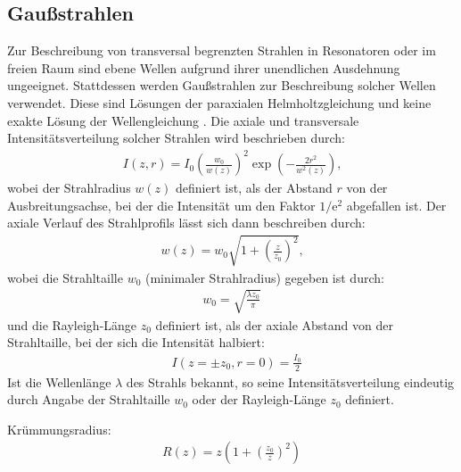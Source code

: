 \documentclass[11pt, a4paper]{article}
\numberwithin{equation}{section}
\begin{document}
\subsection{Gaußstrahlen}
\label{gaussstrahlen}
Zur Beschreibung von transversal begrenzten Strahlen in Resonatoren oder im freien Raum sind ebene Wellen aufgrund ihrer unendlichen Ausdehnung ungeeignet.
Stattdessen werden Gaußstrahlen zur Beschreibung solcher Wellen verwendet.
Diese sind Lösungen der paraxialen Helmholtzgleichung und keine exakte Lösung der Wellengleichung \cite{linden}.
Die axiale und transversale Intensitätsverteilung solcher Strahlen wird beschrieben durch:
\begin{align}
	I(z,r) = I_0 \left( \frac{w_0}{w(z)} \right)^2 \exp\left(- \frac{2 r^2}{w^2(z)} \right) \text{,}
\end{align}
wobei der Strahlradius $w(z)$ definiert ist, als der Abstand $r$ von der Ausbreitungsachse, bei der die Intensität um den Faktor $1/ \mathrm{e}^2$ abgefallen ist.
Der axiale Verlauf des Strahlprofils lässt sich dann beschreiben durch:
\begin{align}
	w(z) = w_0 \sqrt{1 + \left( \frac{z}{z_0} \right)^2} \text{,}
	\label{eq:gauss_axialprofil}
\end{align}
wobei die Strahltaille $w_0$ (minimaler Strahlradius) gegeben ist durch:
\begin{align}
	w_0 = \sqrt{\frac{\lambda z_0}{\pi}}
	\label{eq:rayleigh_laenge}
\end{align}
und die Rayleigh-Länge $z_0$ definiert ist, als der axiale Abstand von der Strahltaille, bei der sich die Intensität halbiert:
\begin{align}
	&I(z = \pm z_0, r =0) = \frac{I_0}{2}
\end{align}
Ist die Wellenlänge $\lambda$ des Strahls bekannt, so seine Intensitätsverteilung eindeutig durch Angabe der Strahltaille $w_0$ oder der Rayleigh-Länge $z_0$ definiert.

Krümmungsradius:
\begin{align}
	R(z) = z \left( 1 + \left( \frac{z_0}{z} \right)^2 \right)
\end{align}
\end{document}
